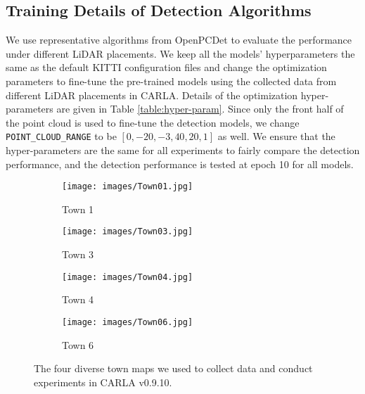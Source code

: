 \documentclass[10pt,twocolumn,letterpaper]{article}
\begin{document}
\subsection{Training Details of Detection Algorithms}
We use representative algorithms from OpenPCDet \cite{openpcdet2020} to evaluate the performance under different LiDAR placements. We keep all the models' hyperparameters the same as the default KITTI configuration files and change the optimization parameters to fine-tune the pre-trained models using the collected data from different LiDAR placements in CARLA.
Details of the optimization hyper-parameters are given in Table {\ref{table:hyper-param}}. Since only the front half of the point cloud is used to fine-tune the detection models, we change \texttt{POINT\_CLOUD\_RANGE} to be $[0, -20, -3, 40, 20, 1]$ as well. We ensure that the hyper-parameters are the same for all experiments to fairly compare the detection performance, and the detection performance is tested at epoch 10 for all models.

\begin{figure}[t]
  \centering
  \begin{subfigure}[b]{0.2\textwidth}
  \texttt{[image: images/Town01.jpg]}
                \caption{Town 1}
    \end{subfigure}%
  \begin{subfigure}[b]{0.2\textwidth}
  \texttt{[image: images/Town03.jpg]}
                \caption{Town 3}
    \end{subfigure}%

      \begin{subfigure}[b]{0.2\textwidth}
  \texttt{[image: images/Town04.jpg]}
                \caption{Town 4}
    \end{subfigure}%
      \begin{subfigure}[b]{0.2\textwidth}
  \texttt{[image: images/Town06.jpg]}
                \caption{Town 6}
    \end{subfigure}%
  \caption{The four diverse town maps we used to collect data and conduct experiments in CARLA v0.9.10.}
  \label{fig:maps}
   \vspace*{-5mm}
\end{figure}
\end{document}
